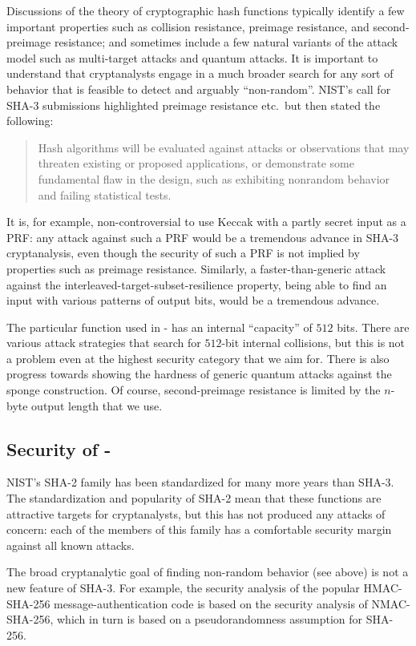 Discussions of the theory of cryptographic hash functions
typically identify a few important properties such as
collision resistance, preimage resistance, and second-preimage resistance;
and sometimes include a few natural variants of the attack model
such as multi-target attacks and quantum attacks.
It is important to understand that cryptanalysts
engage in a much broader search for
any sort of behavior that is feasible to detect and arguably ``non-random''.
NIST's call for SHA-3 submissions highlighted preimage resistance etc.~but then
stated the following:
\begin{quote}
Hash algorithms will be evaluated against attacks or observations that may
threaten existing or proposed applications, or demonstrate some fundamental flaw
in the design, such as exhibiting nonrandom behavior and failing statistical tests.
\end{quote}
It is, for example, non-controversial to use Keccak with a partly secret input as a PRF:
any attack against such a PRF would be a tremendous advance in SHA-3 cryptanalysis,
even though the security of such a PRF is not implied by properties such as preimage resistance.
Similarly, a faster-than-generic attack against the interleaved-target-subset-resilience property,
being able to find an input with various patterns of output bits,
would be a tremendous advance.

The particular function \shaketfs used in \spx-\shathree
has an internal ``capacity'' of $512$ bits.
There are various attack strategies that search for $512$-bit internal collisions,
but this is not a problem even at the highest security category that we aim for.
There is also progress towards showing the hardness of generic quantum attacks
against the sponge construction.
Of course,
second-preimage resistance is limited by the $n$-byte output length that we use.


\subsection{Security of \spx-\shatwo}
NIST's SHA-2 family has been standardized for many more years than SHA-3.
The standardization and popularity of SHA-2
mean that these functions are attractive targets for cryptanalysts,
but this has not produced any attacks of concern:
each of the members of this family
has a comfortable security margin against all known attacks.

The broad cryptanalytic goal of finding non-random behavior (see above)
is not a new feature of SHA-3.
For example,
the security analysis of the popular HMAC-SHA-256 message-authentication code
is based on the security analysis of NMAC-SHA-256,
which in turn is based on a pseudorandomness assumption for SHA-256.

